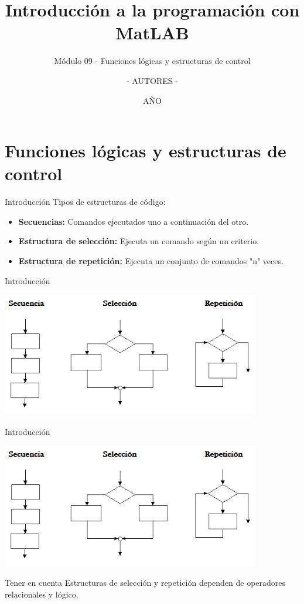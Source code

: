 \documentclass{bredelebeamer}
\title[Programación en MatLAB]{Introducción a la programación con MatLAB}
\subtitle{Módulo 09 - Funciones lógicas y estructuras de control}
\author{- AUTORES - \inst{1}}
\institute[UNIVERSIDAD]
{
  \inst{1}%
  - NOMBRE UNIVERSIDAD - 
  }
\date{AÑO}
\begin{document}
\begin{frame}
  \titlepage 
\end{frame}



\section{Funciones lógicas y estructuras de control}

\begin{frame}{Introducción}
Tipos de estructuras de código:
\begin{itemize}
\item \textbf{Secuencias:} Comandos ejecutados uno a continuación del otro.
\item \textbf{Estructura de selección:} Ejecuta un comando según un criterio.
\item \textbf{Estructura de repetición:} Ejecuta un conjunto de comandos "n" veces.
\end{itemize}
\end{frame}

\begin{frame}{Introducción}
\begin{center}
\includegraphics[scale=0.7]{images/pantalla3.png}
\end{center}
\end{frame}

\begin{frame}{Introducción}
\begin{center}
\includegraphics[scale=0.55]{images/pantalla3.png}
\end{center}
\begin{block}{Tener en cuenta}
Estructuras de selección y repetición dependen de operadores relacionales y lógico.
\end{block}
\end{frame}
\end{document}
